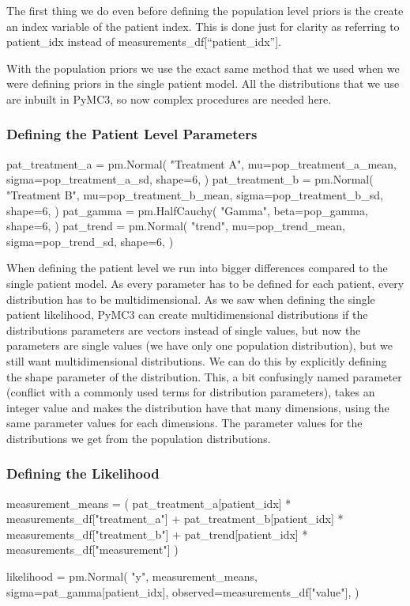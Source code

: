 \documentclass[12pt,a4paper,leqno]{report}
\theoremstyle{plain}
\theoremstyle{definition}
\theoremstyle{remark}
\begin{document}
The first thing we do even before defining the population level priors is the create an
index variable of the patient index. This is done just for clarity as referring to
patient\_idx instead of measurements\_df[``patient\_idx''].

With the population priors we use the exact same method that we used when we were
defining priors in the single patient model. All the distributions that we use are
inbuilt in PyMC3, so now complex procedures are needed here.

\subsubsection{Defining the Patient Level Parameters}

\bigskip
\begin{pyverbatim}
    pat_treatment_a = pm.Normal(
        "Treatment A",
        mu=pop_treatment_a_mean,
        sigma=pop_treatment_a_sd,
        shape=6,
    )
    pat_treatment_b = pm.Normal(
        "Treatment B",
        mu=pop_treatment_b_mean,
        sigma=pop_treatment_b_sd,
        shape=6,
    )
    pat_gamma = pm.HalfCauchy(
        "Gamma", beta=pop_gamma, shape=6,
    )
    pat_trend = pm.Normal(
        "trend",
        mu=pop_trend_mean,
        sigma=pop_trend_sd,
        shape=6,
    )
\end{pyverbatim}
\bigskip

When defining the patient level we run into bigger differences compared to the single
patient model. As every parameter has to be defined for each patient, every distribution
has to be multidimensional. As we saw when defining the single patient likelihood, PyMC3
can create multidimensional distributions if the distributions parameters are vectors
instead of single values, but now the parameters are single values (we have only one
population distribution), but we still want multidimensional distributions. We can do
this by explicitly defining the shape parameter of the distribution. This, a bit
confusingly named parameter (conflict with a commonly used terms for distribution
parameters), takes an integer value and makes the distribution have that many
dimensions, using the same parameter values for each dimensions. The parameter values
for the distributions we get from the population distributions.

\subsubsection{Defining the Likelihood}
\bigskip
\begin{pyverbatim}
    measurement_means = (
        pat_treatment_a[patient_idx] * measurements_df["treatment_a"]
        + pat_treatment_b[patient_idx] * measurements_df["treatment_b"]
        + pat_trend[patient_idx] * measurements_df["measurement"]
    )

    likelihood = pm.Normal(
        "y",
        measurement_means,
        sigma=pat_gamma[patient_idx],
        observed=measurements_df["value"],
    )
\end{pyverbatim}
\bigskip
\end{document}

